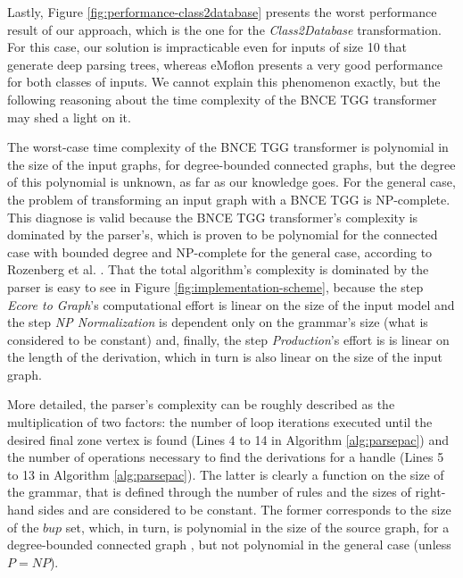Lastly, Figure \ref{fig:performance-class2database} presents the worst performance result of our approach, which is the one for the \emph{Class2Database} transformation. For this case, our solution is impracticable even for inputs of size 10 that generate deep parsing trees, whereas eMoflon presents a very good performance for both classes of inputs. We cannot explain this phenomenon exactly, but the following reasoning about the time complexity of the BNCE TGG transformer may shed a light on it.

The worst-case time complexity of the BNCE TGG transformer is polynomial in the size of the input graphs, for degree-bounded connected graphs, but the degree of this polynomial is unknown, as far as our knowledge goes. For the general case, the problem of transforming an input graph with a BNCE TGG is NP-complete. This diagnose is valid because the BNCE TGG transformer's complexity is dominated by the parser's, which is proven to be polynomial for the connected case with bounded degree and NP-complete for the general case, according to Rozenberg et al. \cite[p. 160]{rozenberg1986boundary}. That the total algorithm's complexity is dominated by the parser is easy to see in Figure \ref{fig:implementation-scheme}, because the step \emph{Ecore to Graph}'s computational effort is linear on the size of the input model and the step \emph{NP Normalization} is dependent only on the grammar's size (what is considered to be constant) and, finally, the step \emph{Production}'s effort is is linear on the length of the derivation, which in turn is also linear on the size of the input graph.

More detailed, the parser's complexity can be roughly described as the multiplication of two factors: the number of loop iterations executed until the desired final zone vertex is found (Lines 4 to 14 in Algorithm \ref{alg:parsepac}) and the number of operations necessary to find the derivations for a handle (Lines 5 to 13 in Algorithm \ref{alg:parsepac}). The latter is clearly a function on the size of the grammar, that is defined through the number of rules and the sizes of right-hand sides and are considered to be constant. The former corresponds to the size of the $bup$ set, which, in turn, is polynomial in the size of the source graph, for a degree-bounded connected graph \cite[p. 161]{rozenberg1986boundary}, but not polynomial in the general case (unless $P=NP$).


